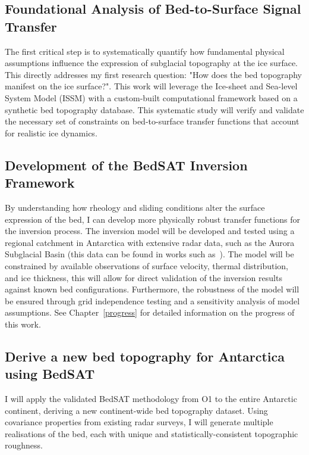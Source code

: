 \subsection{Foundational Analysis of Bed-to-Surface Signal Transfer}\label{paper1}
The first critical step is to systematically quantify how fundamental physical assumptions influence the expression of subglacial topography at the ice surface.
This directly addresses my first research question: "How does the bed topography manifest on the ice surface?". This work will leverage the Ice-sheet and Sea-level System Model (ISSM) with a custom-built computational framework based on a synthetic bed topography database. This systematic study will verify and validate the necessary set of constraints on bed-to-surface transfer functions that account for realistic ice dynamics. %


\subsection{Development of the BedSAT Inversion Framework}
By understanding how rheology and sliding conditions alter the surface expression of the bed, I can develop more physically robust transfer functions for the inversion process. The inversion model will be developed and tested using a regional catchment in Antarctica with extensive radar data, such as the Aurora Subglacial Basin (this data can be found in works such as~\cite{Young_2011}). The model will be constrained by available observations of surface velocity, thermal distribution, and ice thickness, this will allow for direct validation of the inversion results against known bed configurations. Furthermore, the robustness of the model will be ensured through grid independence testing and a sensitivity analysis of model assumptions. See Chapter~\ref{progress} for detailed information on the progress of this work.

\subsection{Derive a new bed topography for Antarctica using BedSAT}
I will apply the validated BedSAT methodology from O1 to the entire Antarctic continent, deriving a new continent-wide bed topography dataset. Using covariance properties from existing radar surveys, I will generate multiple realisations of the bed, each with unique and statistically-consistent topographic roughness.


